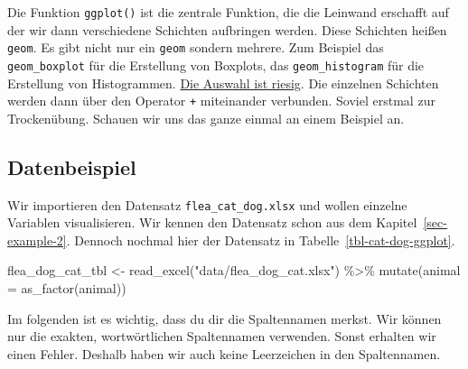 \documentclass[
  letterpaper,
  DIV=11,
  oneside]{scrreport}
\newenvironment{Shaded}{\begin{snugshade}}{\end{snugshade}}
\newcommand{\AttributeTok}[1]{\textcolor[rgb]{0.40,0.45,0.13}{#1}}
\newcommand{\FunctionTok}[1]{\textcolor[rgb]{0.28,0.35,0.67}{#1}}
\newcommand{\NormalTok}[1]{\textcolor[rgb]{0.00,0.23,0.31}{#1}}
\newcommand{\OtherTok}[1]{\textcolor[rgb]{0.00,0.23,0.31}{#1}}
\newcommand{\SpecialCharTok}[1]{\textcolor[rgb]{0.37,0.37,0.37}{#1}}
\newcommand{\StringTok}[1]{\textcolor[rgb]{0.13,0.47,0.30}{#1}}
\begin{document}
Die Funktion \texttt{ggplot()} ist die zentrale Funktion, die die
Leinwand erschafft auf der wir dann verschiedene Schichten aufbringen
werden. Diese Schichten heißen \texttt{geom}. Es gibt nicht nur ein
\texttt{geom} sondern mehrere. Zum Beispiel das \texttt{geom\_boxplot}
für die Erstellung von Boxplots, das \texttt{geom\_histogram} für die
Erstellung von Histogrammen.
\href{https://ggplot2.tidyverse.org/reference/index.html}{Die Auswahl
ist riesig}. Die einzelnen Schichten werden dann über den Operator
\texttt{+} miteinander verbunden. Soviel erstmal zur Trockenübung.
Schauen wir uns das ganze einmal an einem Beispiel an.

\hypertarget{datenbeispiel}{%
\subsection{Datenbeispiel}\label{datenbeispiel}}

Wir importieren den Datensatz \texttt{flea\_cat\_dog.xlsx} und wollen
einzelne Variablen visualisieren. Wir kennen den Datensatz schon aus dem
Kapitel~\ref{sec-example-2}. Dennoch nochmal hier der Datensatz in
Tabelle~\ref{tbl-cat-dog-ggplot}.

\begin{Shaded}
\begin{Highlighting}[]
\NormalTok{flea\_dog\_cat\_tbl }\OtherTok{\textless{}{-}} \FunctionTok{read\_excel}\NormalTok{(}\StringTok{"data/flea\_dog\_cat.xlsx"}\NormalTok{) }\SpecialCharTok{\%\textgreater{}\%} 
  \FunctionTok{mutate}\NormalTok{(}\AttributeTok{animal =} \FunctionTok{as\_factor}\NormalTok{(animal))}
\end{Highlighting}
\end{Shaded}

{}

Im folgenden ist es wichtig, dass du dir die Spaltennamen merkst. Wir
können nur die exakten, wortwörtlichen Spaltennamen verwenden. Sonst
erhalten wir einen Fehler. Deshalb haben wir auch keine Leerzeichen in
den Spaltennamen.
\end{document}
